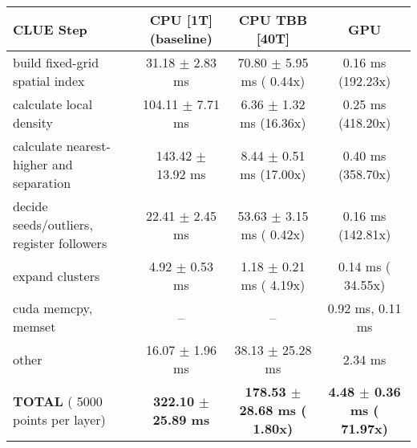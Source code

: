     \begin{tabular}{l|c|c|c}
    \hline
    CLUE Step                                 & CPU [1T] (baseline)         & CPU TBB [40T]                         & GPU                       \\ \hline
    build fixed-grid spatial index            &  31.18 $\pm$  2.83 ms       &  70.80 $\pm$  5.95 ms ( 0.44x)        &   0.16 ms (192.23x)       \\
    calculate local density                   & 104.11 $\pm$  7.71 ms       &   6.36 $\pm$  1.32 ms (16.36x)        &   0.25 ms (418.20x)       \\
    calculate nearest-higher and separation   & 143.42 $\pm$ 13.92 ms       &   8.44 $\pm$  0.51 ms (17.00x)        &   0.40 ms (358.70x)       \\
    decide seeds/outliers, register followers &  22.41 $\pm$  2.45 ms       &  53.63 $\pm$  3.15 ms ( 0.42x)        &   0.16 ms (142.81x)       \\
    expand clusters                           &   4.92 $\pm$  0.53 ms       &   1.18 $\pm$  0.21 ms ( 4.19x)        &   0.14 ms ( 34.55x)       \\ \hline
    cuda memcpy, memset                       & --                          & --                                    &   0.92 ms,   0.11 ms      \\ 
    other                                     &  16.07 $\pm$  1.96 ms       &  38.13 $\pm$ 25.28 ms                 &   2.34 ms                 \\ \hline
    \textbf{TOTAL} ( 5000 points per layer)   & \textbf{322.10 $\pm$ 25.89 ms} & \textbf{178.53 $\pm$ 28.68 ms ( 1.80x)} & \textbf{  4.48 $\pm$  0.36 ms ( 71.97x)}  \\
    \hline 
    \end{tabular}
    \linebreak



